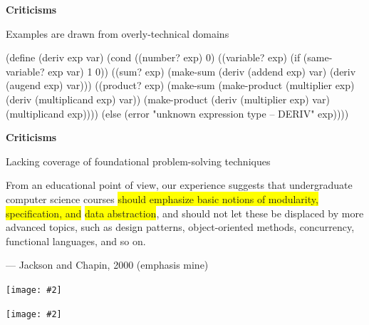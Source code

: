 \documentclass[UKenglish,usenames,dvipsnames,svgnames,table,aspectratio=169,mathserif]{beamer}
\newcommand{\highlight}[1]{\colorbox{yellow}{#1}}
\newcommand{\nl}{\vspace{\baselineskip}}
\newcommand{\imageslide}[2][1]{{
\begin{frame}\begin{center}
\texttt{[image: \#2]}
\end{center}\end{frame}
}}
\begin{document}
\begin{frame}[fragile]

\begin{center}
{\bf Criticisms}
\end{center}
\begin{center}
Examples are drawn from overly-technical domains

\nl

{\scriptsize
\begin{schemecode}
(define (deriv exp var)
  (cond ((number? exp) 0)
        ((variable? exp)
         (if (same-variable? exp var) 1 0))
        ((sum? exp)
         (make-sum (deriv (addend exp) var)
                   (deriv (augend exp) var)))
        ((product? exp)
         (make-sum
           (make-product (multiplier exp)
                         (deriv (multiplicand exp) var))
           (make-product (deriv (multiplier exp) var)
                         (multiplicand exp))))
        (else
         (error "unknown expression type -- DERIV" exp))))
\end{schemecode}
}
\end{center}
\end{frame}


\begin{frame}

\begin{center}
{\bf Criticisms}
\end{center}
\begin{center}
Lacking coverage of foundational problem-solving techniques
\end{center}

\begin{block}{}
From an educational point of view, our experience suggests that undergraduate \\
computer science courses \highlight{should emphasize basic notions of modularity, specification, and}
\highlight{data abstraction}, and should not let these be displaced by more advanced topics,
such as design patterns, object-oriented methods, concurrency, functional languages,
and so on.

\nl

--- Jackson and Chapin, 2000
(emphasis mine)
\end{block}
\end{frame}

\imageslide[0.5]{htdp-cover.png}

\imageslide[0.55]{expected-four-args.png}
\end{document}
